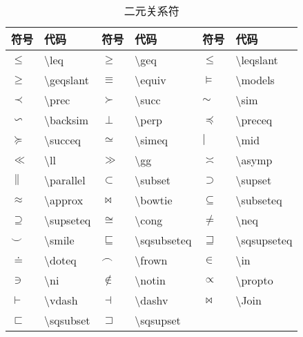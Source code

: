 \documentclass[UTF8,fontset=ubuntu]{ctexart}
\begin{document}
\begin{table}[H]
\begin{minipage}{\textwidth}
\begin{tabular}{l l l l l l}
	\hline
	符号 & 代码 & 符号 & 代码 & 符号 & 代码\\
	\hline
	$\leq$ & \textbackslash leq & $\geq$ & \textbackslash  geq & $\leqslant$ & \textbackslash  leqslant\footnotemark[1]\\
	$\geqslant$ & \textbackslash  geqslant\footnotemark[1] & $\equiv$ & \textbackslash  equiv & $\models$ & \textbackslash  models\\
	$\prec$ & \textbackslash  prec & $\succ$ & \textbackslash  succ & $\sim$ & \textbackslash  sim\\
	$\backsim$ & \textbackslash  backsim\footnotemark[1] & $\perp$ & \textbackslash  perp & $\preceq$ & \textbackslash  preceq\\
	$\succeq$ & \textbackslash  succeq & $\simeq$ & \textbackslash  simeq & $\mid$ & \textbackslash  mid\\
	$\ll$ & \textbackslash  ll & $\gg$ & \textbackslash  gg & $\asymp$ & \textbackslash  asymp\\
	$\parallel$ & \textbackslash  parallel & $\subset$ & \textbackslash  subset & $\supset$ & \textbackslash  supset\\
	$\approx$ & \textbackslash  approx & $\bowtie$ & \textbackslash  bowtie & $\subseteq$ & \textbackslash  subseteq\\
	$\supseteq$ & \textbackslash  supseteq & $\cong$ & \textbackslash  cong & $\neq$ & \textbackslash  neq\\
	$\smile$ & \textbackslash  smile & $\sqsubseteq$ & \textbackslash  sqsubseteq & $\sqsupseteq$ & \textbackslash  sqsupseteq\\
	$\doteq$ & \textbackslash  doteq & $\frown$ & \textbackslash  frown & $\in$ & \textbackslash  in\\
	$\ni$ & \textbackslash  ni & $\notin$ & \textbackslash  notin & $\propto$ & \textbackslash  propto\\
	$\vdash$ & \textbackslash  vdash & $\dashv$ & \textbackslash  dashv & $\Join$ & \textbackslash  Join\footnotemark[2]\\
	$\sqsubset$ & \textbackslash sqsubset\footnotemark[2] & $\sqsupset$ & \textbackslash  sqsupset\footnotemark[2]\\
	\hline
\end{tabular}
\end{minipage}
\caption{二元关系符}
\end{table}
\end{document}
